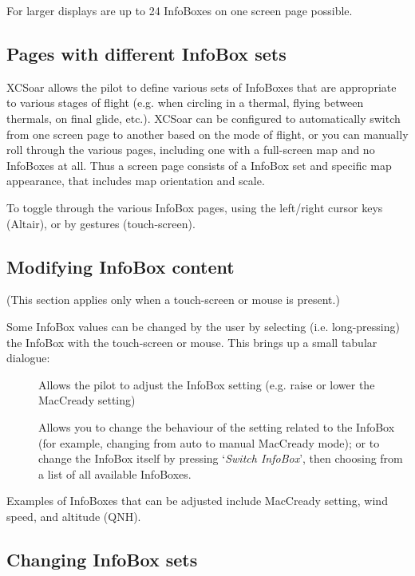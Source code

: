 For larger displays are up to 24 InfoBoxes on one screen page possible.


\subsection*{Pages with different InfoBox sets}

XCSoar allows the pilot to define various sets of InfoBoxes that are
appropriate to various stages of flight (e.g. when circling in a thermal,
flying between thermals, on final glide, etc.). XCSoar can be configured
to automatically switch from one screen page to another based on the mode
of flight, or you can manually roll through the various pages, including
one with a full-screen map and no InfoBoxes at all. Thus a screen page
consists of a InfoBox set and specific map appearance, that includes
map orientation and scale.

To toggle through the various InfoBox pages, using the left/right cursor
keys (Altair), or by gestures (touch-screen).


\subsection*{Modifying InfoBox content}

(This section applies only when a touch-screen or mouse is present.)

Some InfoBox values can be changed by the user by selecting (i.e. long-pressing) the
InfoBox with the touch-screen or mouse.  This brings up a small tabular dialogue:

\begin{description}
\item[]
  Allows the pilot to adjust the InfoBox setting (e.g. raise or lower the
  MacCready setting)

\item[]
  Allows you to change the behaviour of the setting related to the InfoBox
  (for example, changing from auto to manual MacCready mode); or
  to change the InfoBox itself by pressing `{\it Switch InfoBox}', then
  choosing from a list of all available InfoBoxes.

\end{description}

Examples of InfoBoxes that can
be adjusted include MacCready setting, wind speed, and altitude (QNH).


\subsection*{Changing InfoBox sets}

